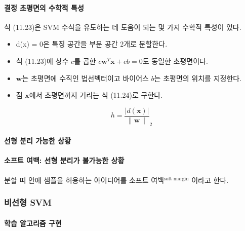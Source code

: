\documentclass [12pt] {oblivoir}
\let\oldsubsubsection=\subsubsection
\renewcommand{\subsubsection}
{
  \filbreak
  \oldsubsubsection
}
\begin{document}
\paragraph*{결정 초평면의 수학적 특성}\mbox{}

식 (11.23)은 SVM 수식을 유도하는 데 도움이 되는 몇 가지 수학적 특성이 있다.

\begin{itemize}
  \item d(x) = 0은 특징 공간을 부분 공간 2개로 분할한다.
  \item 식 (11.23)에 상수 $c$를 곱한 $c\mathbf{w}^{T}\mathbf{x} + cb = 0$도 동일한 초평면이다.
  \item $\mathbf{w}$는 초평면에 수직인 법선벡터이고 바이어스 $b$는 초평면의 위치를 지정한다.
  \item 점 $\mathbf{x}$에서 초평면까지 거리는 식 (11.24)로 구한다.
\end{itemize}

\begin{equation} \tag{11.24}
  h = \frac{\lvert d(\mathbf{x}) \rvert}{\lVert \mathbf{w} \rVert}_{2}
\end{equation}

\vspace{3mm}

\paragraph*{선형 분리 가능한 상황}\mbox{}

\vspace{3mm}

\paragraph*{소프트 여백: 선형 분리가 불가능한 상황}\mbox{}

분할 띠 안에 샘플을 허용하는 아이디어를 소프트 여백$^{\text{soft margin}}$ 이라고 한다.

\vspace{3mm}

\subsubsection{비선형 SVM}

\paragraph*{학습 알고리즘 구현}\mbox{}
\end{document}
